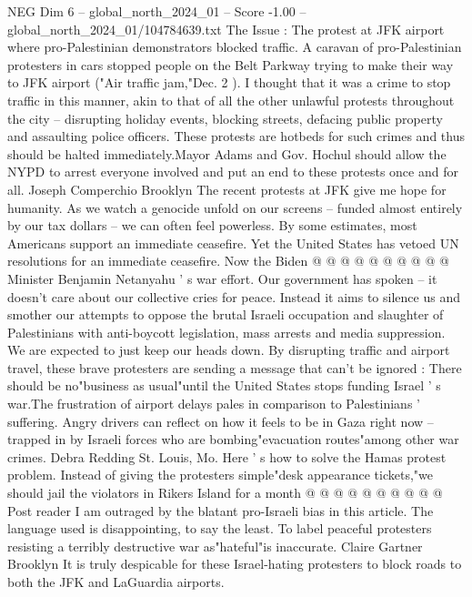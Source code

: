 \begin{textsample}{NEG Dim 6 – global\_north\_2024\_01 – Score -1.00 – global\_north\_2024\_01/104784639.txt}  \label{ex:f6_neg_365}
The Issue : The protest at JFK airport where pro-Palestinian demonstrators blocked traffic.
A caravan of pro-Palestinian protesters in cars stopped people on the Belt Parkway trying to make their way to JFK airport ("Air traffic jam,"Dec. 2 ).
I thought that it was a crime to stop traffic in this manner, akin to that of all the other unlawful protests throughout the city -- disrupting holiday events, blocking streets, defacing public property and assaulting police officers.
These protests are hotbeds for such crimes and thus should be halted immediately.Mayor Adams and Gov.
Hochul should allow the NYPD to arrest everyone involved and put an end to these protests once and for all.
Joseph Comperchio Brooklyn The recent protests at JFK give me hope for humanity.
As we watch a genocide unfold on our screens -- funded almost entirely by our tax dollars -- we can often feel powerless.
By some estimates, most Americans support an immediate ceasefire.
Yet the United States has vetoed UN resolutions for an immediate ceasefire.
Now the Biden @ @ @ @ @ @ @ @ @ @ Minister Benjamin Netanyahu ' s war effort.
Our government has spoken -- it doesn't care about our collective cries for peace.
Instead it aims to silence us and smother our attempts to oppose the brutal Israeli occupation and slaughter of Palestinians with anti-boycott legislation, mass arrests and media suppression.
We are expected to just keep our heads down.
By disrupting traffic and airport travel, these brave protesters are sending a message that can't be ignored : There should be no"business as usual"until the United States stops funding Israel ' s war.The frustration of airport delays pales in comparison to Palestinians ' suffering.
Angry drivers can reflect on how it feels to be in Gaza right now -- trapped in by Israeli forces who are bombing"evacuation routes"among other war crimes.
Debra Redding St.
Louis, Mo.
Here ' s how to solve the Hamas protest problem.
Instead of giving the protesters simple"desk appearance tickets,"we should jail the violators in Rikers Island for a month @ @ @ @ @ @ @ @ @ @ Post reader I am outraged by the blatant pro-Israeli bias in this article.
The language used is disappointing, to say the least.
To label peaceful protesters resisting a terribly destructive war as"hateful"is inaccurate.
Claire Gartner Brooklyn It is truly despicable for these Israel-hating protesters to block roads to both the JFK and LaGuardia airports.

\end{textsample}
